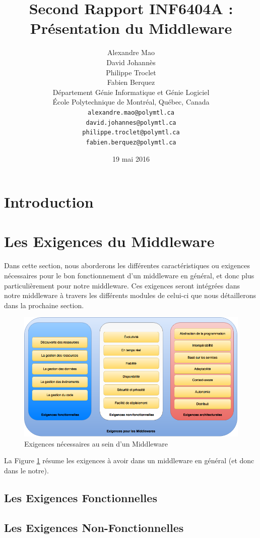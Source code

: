 \documentclass{article}
\title{Second Rapport INF6404A : Présentation du Middleware}
\author{
	Alexandre Mao\\
	David Johannès \\
	Philippe Troclet \\
	Fabien Berquez \\
	D\'{e}partement G\'{e}nie Informatique et G\'{e}nie Logiciel \\
	\'{E}cole Polytechnique de Montr\'{e}al, Qu\'{e}bec, Canada \\
	\texttt{alexandre.mao@polymtl.ca}\\
	\texttt{david.johannes@polymtl.ca}\\
	\texttt{philippe.troclet@polymtl.ca}   \\
	\texttt{fabien.berquez@polymtl.ca}   \\
}
\date{19 mai 2016}
\begin{document}
\maketitle

\section{Introduction}


\section{Les Exigences du Middleware}
Dans cette section, nous aborderons les différentes caractéristiques ou exigences nécessaires \cite{razzaquemiddleware} \cite{prof} pour le bon fonctionnement d'un middleware en général, et donc plus particulièrement pour notre middleware. Ces exigences seront intégrées dans notre middleware à travers les différents modules de celui-ci que nous détaillerons dans la prochaine section.

\begin{figure}[h!]
	\hspace*{-3cm}
	\centering
	\includegraphics[width=1.5\textwidth]{Figure3.png}
	\caption{Exigences nécessaires au sein d'un Middleware}
	\label{fig:exigences}
\end{figure}

La Figure \ref{fig:exigences} résume les exigences à avoir dans un middleware en général (et donc dans le notre).

\subsection{Les Exigences Fonctionnelles}

\subsection{Les Exigences Non-Fonctionnelles}

\end{document}
